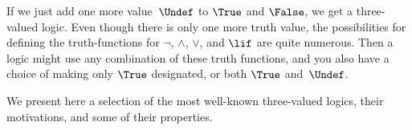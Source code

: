 \documentclass[../../../include/open-logic-section]{subfiles}
\begin{document}


If we just add one more value~$\Undef$ to $\True$ and $\False$, we get a
three-valued logic. Even though there is only one more truth value,
the possibilities for defining the truth-functions for $\lnot$,
$\land$, $\lor$, and $\lif$ are quite numerous. Then a logic might use
any combination of these truth functions, and you also have a choice
of making only $\True$ designated, or both $\True$ and~$\Undef$.

We present here a selection of the most well-known three-valued
logics, their motivations, and some of their properties.
\end{document}
